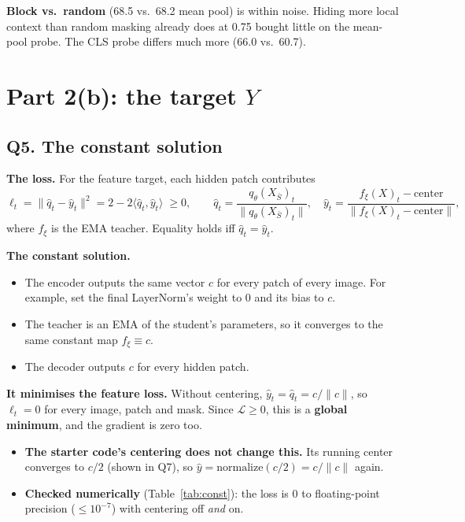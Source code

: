 \documentclass[11pt]{article}
\begin{document}
\textbf{Block vs.\ random} (68.5 vs.\ 68.2 mean pool) is within noise. Hiding more local context than random masking already does at 0.75 bought little on the mean-pool probe. The CLS probe differs much more (66.0 vs.\ 60.7).

\section{Part 2(b): the target $Y$}

\subsection*{Q5. The constant solution}
\textbf{The loss.} For the feature target, each hidden patch contributes
\[
\ell_t=\|\hat q_t-\hat y_t\|^2=2-2\langle\hat q_t,\hat y_t\rangle\;\ge0,
\qquad
\hat q_t=\frac{q_\theta(X_{\bar S})_t}{\|q_\theta(X_{\bar S})_t\|},\quad
\hat y_t=\frac{f_\xi(X)_t-\text{center}}{\|f_\xi(X)_t-\text{center}\|},
\]
where $f_\xi$ is the EMA teacher. Equality holds iff $\hat q_t=\hat y_t$.

\textbf{The constant solution.}
\begin{itemize}
  \item The encoder outputs the same vector $c$ for every patch of every image. For example, set the final LayerNorm's weight to 0 and its bias to $c$.
  \item The teacher is an EMA of the student's parameters, so it converges to the same constant map $f_\xi\equiv c$.
  \item The decoder outputs $c$ for every hidden patch.
\end{itemize}

\textbf{It minimises the feature loss.} Without centering, $\hat y_t=\hat q_t=c/\|c\|$, so $\ell_t=0$ for every image, patch and mask. Since $\mathcal L\ge0$, this is a \textbf{global minimum}, and the gradient is zero too.
\begin{itemize}
  \item \textbf{The starter code's centering does not change this.} Its running center converges to $c/2$ (shown in Q7), so $\hat y=\mathrm{normalize}(c/2)=c/\|c\|$ again.
  \item \textbf{Checked numerically} (Table~\ref{tab:const}): the loss is 0 to floating-point precision ($\le10^{-7}$) with centering off \emph{and} on.
\end{itemize}
\end{document}
